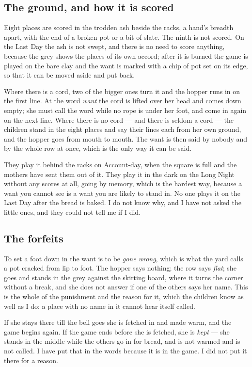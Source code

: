 \documentclass{design/chronicle}
\begin{document}
\subsection*{The ground, and how it is scored}

Eight places are scored in the trodden ash beside the racks, a hand’s breadth apart, with the end of a broken pot or a bit of slate. The ninth is not scored. On the Last Day the ash is not swept, and there is no need to score anything, because the grey shows the places of its own accord; after it is burned the game is played on the bare clay and the want is marked with a chip of pot set on its edge, so that it can be moved aside and put back.

Where there is a cord, two of the bigger ones turn it and the hopper runs in on the first line. At the word \emph{want} the cord is lifted over her head and comes down empty; she must call the word while no rope is under her foot, and come in again on the next line. Where there is no cord — and there is seldom a cord — the children stand in the eight places and say their lines each from her own ground, and the hopper goes from mouth to mouth. The want is then said by nobody and by the whole row at once, which is the only way it can be said.

They play it behind the racks on Account-day, when the square is full and the mothers have sent them out of it. They play it in the dark on the Long Night without any scores at all, going by memory, which is the hardest way, because a want you cannot see is a want you are likely to stand in. No one plays it on the Last Day after the bread is baked. I do not know why, and I have not asked the little ones, and they could not tell me if I did.

\subsection*{The forfeits}

To set a foot down in the want is to be \emph{gone wrong}, which is what the yard calls a pot cracked from lip to foot. The hopper says nothing; the row says \emph{flat}; she goes and stands in the grey against the skirting board, where it turns the corner without a break, and she does not answer if one of the others says her name. This is the whole of the punishment and the reason for it, which the children know as well as I do: a place with no name in it cannot hear itself called.

If she stays there till the bell goes she is fetched in and made warm, and the game begins again. If the game ends before she is fetched, she is \emph{kept} — she stands in the middle while the others go in for bread, and is not warmed and is not called. I have put that in the words because it is in the game. I did not put it there for a reason.
\end{document}
